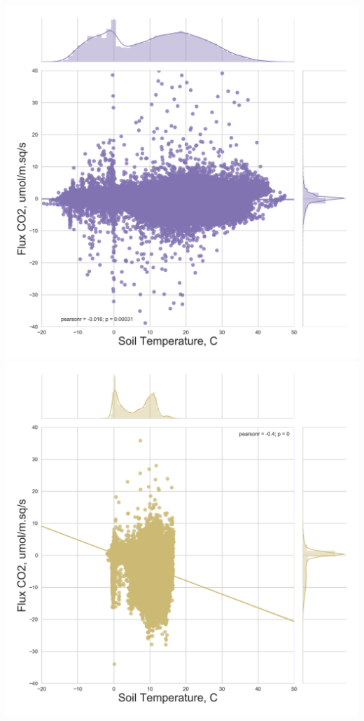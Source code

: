 \documentclass{beamer}
\begin{document}
\begin{frame}
\begin{columns}[t]
\centering
\includegraphics[width=\textwidth]{FvsT_day/US-FPe.png}\\
\includegraphics[width=\textwidth]{FvsT_day/US-Los.png}
\end{columns}

\end{frame}
\end{document}
